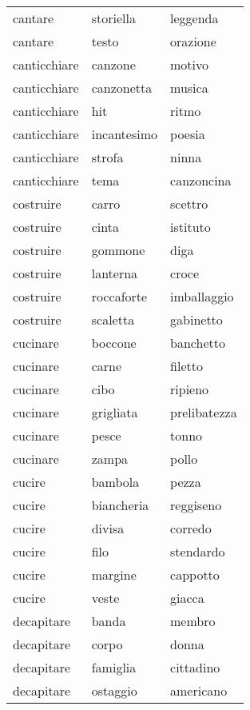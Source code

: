 \begin{longtable}{l|ll}
cantare        & storiella     & leggenda     \\
cantare        & testo         & orazione     \\
canticchiare   & canzone       & motivo       \\
canticchiare   & canzonetta    & musica       \\
canticchiare   & hit           & ritmo        \\
canticchiare   & incantesimo   & poesia       \\
canticchiare   & strofa        & ninna        \\
canticchiare   & tema          & canzoncina   \\
costruire      & carro         & scettro      \\
costruire      & cinta         & istituto     \\
costruire      & gommone       & diga         \\
costruire      & lanterna      & croce        \\
costruire      & roccaforte    & imballaggio  \\
costruire      & scaletta      & gabinetto    \\
cucinare       & boccone       & banchetto    \\
cucinare       & carne         & filetto      \\
cucinare       & cibo          & ripieno      \\
cucinare       & grigliata     & prelibatezza \\
cucinare       & pesce         & tonno        \\
cucinare       & zampa         & pollo        \\
cucire         & bambola       & pezza        \\
cucire         & biancheria    & reggiseno    \\
cucire         & divisa        & corredo      \\
cucire         & filo          & stendardo    \\
cucire         & margine       & cappotto     \\
cucire         & veste         & giacca       \\
decapitare     & banda         & membro       \\
decapitare     & corpo         & donna        \\
decapitare     & famiglia      & cittadino    \\
decapitare     & ostaggio      & americano    \\

\end{longtable}
